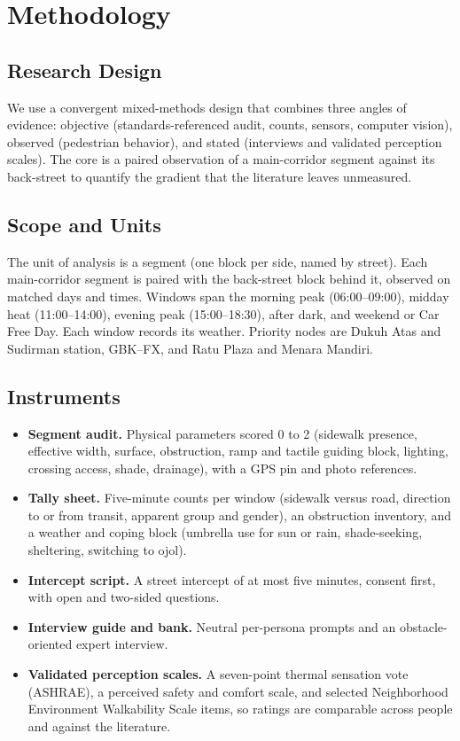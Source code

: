 \documentclass[conference]{IEEEtran}
\begin{document}
\section{Methodology}
\subsection{Research Design}
We use a convergent mixed-methods design that combines three angles of evidence: objective
(standards-referenced audit, counts, sensors, computer vision), observed (pedestrian behavior),
and stated (interviews and validated perception scales). The core is a paired observation of a
main-corridor segment against its back-street to quantify the gradient that the literature leaves
unmeasured.

\subsection{Scope and Units}
The unit of analysis is a segment (one block per side, named by street). Each main-corridor
segment is paired with the back-street block behind it, observed on matched days and times.
Windows span the morning peak (06:00--09:00), midday heat (11:00--14:00), evening peak
(15:00--18:30), after dark, and weekend or Car Free Day. Each window records its weather. Priority
nodes are Dukuh Atas and Sudirman station, GBK--FX, and Ratu Plaza and Menara Mandiri.

\subsection{Instruments}
\begin{itemize}
  \item \textbf{Segment audit.} Physical parameters scored 0 to 2 (sidewalk presence, effective
        width, surface, obstruction, ramp and tactile guiding block, lighting, crossing access,
        shade, drainage), with a GPS pin and photo references.
  \item \textbf{Tally sheet.} Five-minute counts per window (sidewalk versus road, direction to or
        from transit, apparent group and gender), an obstruction inventory, and a weather and
        coping block (umbrella use for sun or rain, shade-seeking, sheltering, switching to ojol).
  \item \textbf{Intercept script.} A street intercept of at most five minutes, consent first, with
        open and two-sided questions.
  \item \textbf{Interview guide and bank.} Neutral per-persona prompts and an obstacle-oriented
        expert interview.
  \item \textbf{Validated perception scales.} A seven-point thermal sensation vote (ASHRAE), a
        perceived safety and comfort scale, and selected Neighborhood Environment Walkability Scale
        items, so ratings are comparable across people and against the literature.
\end{itemize}
\end{document}
